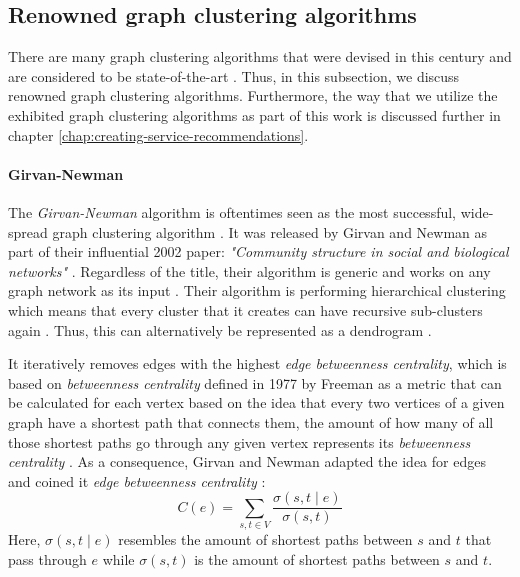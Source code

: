 \documentclass[12pt,a4paper]{report}
\begin{document}
\subsection{Renowned graph clustering algorithms} \label{subsect:renowned-graph-clustering-algorithms}

There are many graph clustering algorithms that were devised in this century
and are considered to be state-of-the-art \cite{lancichinetti2009community,
fortunato2010community, danon2005comparing}. Thus, in this subsection, we
discuss renowned graph clustering algorithms. Furthermore, the way that we
utilize the exhibited graph clustering algorithms as part of this work is
discussed further in chapter \ref{chap:creating-service-recommendations}.

\paragraph{Girvan-Newman \cite{girvan2002community}}
The \textit{Girvan-Newman}
algorithm is oftentimes seen as the most successful, wide-spread graph
clustering algorithm \cite{lancichinetti2009community}. It was released by
Girvan and Newman as part of their influential 2002 paper: \textit{"Community
structure in social and biological networks"} \cite{girvan2002community}.
Regardless of the title, their algorithm is generic and works on any graph
network as its input \cite{lancichinetti2009community}. Their algorithm is
performing hierarchical clustering which means that every cluster that it
creates can have recursive sub-clusters again \cite{girvan2002community}. Thus,
this can alternatively be represented as a dendrogram \cite{newman2004fast}.

It iteratively removes edges with the highest \textit{edge betweenness
centrality}, which is based on \textit{betweenness centrality} defined in 1977
by Freeman as a metric that can be calculated for each vertex based on the idea
that every two vertices of a given graph have a shortest path that connects
them, the amount of how many of all those shortest paths go through any given
vertex represents its \textit{betweenness centrality} \cite{freeman1977set}. As
a consequence, Girvan and Newman adapted the idea for edges and coined it
\textit{edge betweenness centrality} \cite{girvan2002community}:
\[
  C(e) = \sum_{s, t \in V} \frac{\sigma(s, t \mid e)}{\sigma(s, t)}
\]
Here, \(\sigma(s, t \mid e)\) resembles the amount of shortest paths between
\(s\) and \(t\) that pass through \(e\) while \(\sigma(s, t)\) is the
amount of shortest paths between \(s\) and \(t\).
\end{document}
